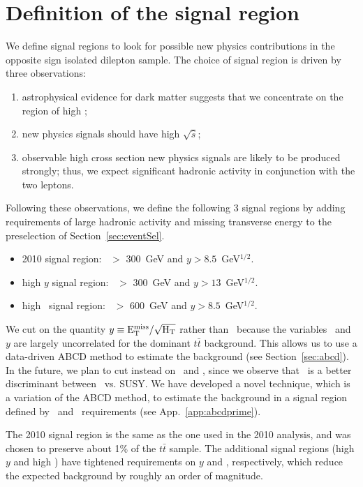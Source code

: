 \section{Definition of the signal region}
\label{sec:sigregion}

We define signal regions to look for possible
new physics contributions in the opposite sign isolated 
dilepton sample. The choice of signal region is driven by 
three observations:
\begin{enumerate}
\item astrophysical evidence for dark matter suggests that
we concentrate on the region of high \met;
\item new physics signals should have high $\sqrt{\hat{s}}$;
\item observable high cross section new physics signals 
are likely to be produced strongly;  thus, we expect significant
hadronic activity in conjunction with the two leptons.
\end{enumerate}

Following these observations, we define the following 3 signal regions by 
adding requirements of large hadronic activity and missing transverse energy 
to the preselection of Section~\ref{sec:eventSel}. 
\begin{itemize}
\item 2010 signal region:      \Ht\ $>$ 300~GeV and $y > 8.5$~GeV$^{1/2}$.
\item high $y$  signal region: \Ht\ $>$ 300~GeV and $y > 13$~GeV$^{1/2}$.
\item high \Ht\ signal region: \Ht\ $>$ 600~GeV and $y > 8.5$~GeV$^{1/2}$.
\end{itemize}

We cut on the quantity $y \equiv \rm E_{T}^{miss}/\sqrt{H_T}$ rather than \met\
because the variables \Ht\ and $y$ are
largely uncorrelated for the dominant $t\bar{t}$ background.  
This allows us to use a data-driven ABCD method to estimate the
background (see Section~\ref{sec:abcd}). In the future, we plan to cut instead
on \met\ and \Ht, since we observe that \met\ is a better discriminant between
\ttbar\ vs. SUSY. We have developed a novel technique, which is a variation of 
the ABCD method, to estimate the background in a signal region defined by
\met\ and \Ht\ requirements (see App.~\ref{app:abcdprime}).

The 2010 signal region is the same as the one used in the 2010 analysis, and was
chosen to preserve about 1\% of the $t\bar{t}$ sample.
The additional signal regions (high $y$ and high \Ht) have tightened requirements
on $y$ and \Ht, respectively, which reduce the expected background by roughly
an order of magnitude.

